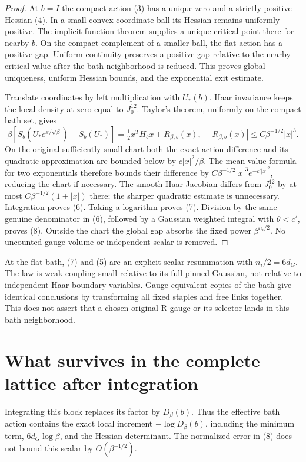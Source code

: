 \documentclass{article}
\begin{document}
\begin{proof}
At $b=I$ the compact action (3) has a unique zero and a strictly positive Hessian (4). In a small convex coordinate ball its Hessian remains uniformly positive. The implicit function theorem supplies a unique critical point there for nearby $b$. On the compact complement of a smaller ball, the flat action has a positive gap. Uniform continuity preserves a positive gap relative to the nearby critical value after the bath neighborhood is reduced. This proves global uniqueness, uniform Hessian bounds, and the exponential exit estimate.

Translate coordinates by left multiplication with $U_*(b)$. Haar invariance keeps the local density at zero equal to $J_0^{12}$. Taylor's theorem, uniformly on the compact bath set, gives
\[
 \beta[S_b(U_*e^{x/\sqrt\beta})-S_b(U_*)]
 =\tfrac12 x^TH_bx+R_{\beta,b}(x),\quad
 |R_{\beta,b}(x)|\leq C\beta^{-1/2}|x|^3.
\]
On the original sufficiently small chart both the exact action difference and its quadratic approximation are bounded below by $c|x|^2/\beta$. The mean-value formula for two exponentials therefore bounds their difference by
$C\beta^{-1/2}|x|^3e^{-c'|x|^2}$, reducing the chart if necessary. The smooth Haar Jacobian differs from $J_0^{12}$ by at most $C\beta^{-1/2}(1+|x|)$ there; the sharper quadratic estimate is unnecessary. Integration proves (6). Taking a logarithm proves (7). Division by the same genuine denominator in (6), followed by a Gaussian weighted integral with $\theta<c'$, proves (8). Outside the chart the global gap absorbs the fixed power $\beta^{n_i/2}$. No uncounted gauge volume or independent scalar is removed.
\end{proof}

At the flat bath, (7) and (5) are an explicit scalar resummation with $n_i/2=6d_G$. The law is weak-coupling small relative to its full pinned Gaussian, not relative to independent Haar boundary variables. Gauge-equivalent copies of the bath give identical conclusions by transforming all fixed staples and free links together. This does not assert that a chosen original R gauge or its selector lands in this bath neighborhood.

\section{What survives in the complete lattice after integration}
Integrating this block replaces its factor by $D_\beta(b)$. Thus the effective bath action contains the exact local increment $-\log D_\beta(b)$, including the minimum term, $6d_G\log\beta$, and the Hessian determinant. The normalized error in (8) does not bound this scalar by $O(\beta^{-1/2})$.
\end{document}
